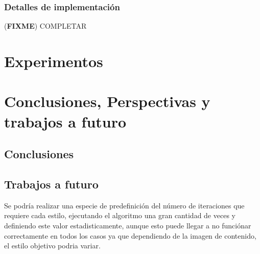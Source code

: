 \documentclass[a4paper,11pt,spanish]{book}
\newcommand*{\FIXME}[1]{{(\textbf{FIXME}) {#1}}}
\begin{document}
    \subsection{Detalles de implementación}
      \FIXME{COMPLETAR}

\chapter{Experimentos}

\chapter{Conclusiones, Perspectivas y trabajos a futuro}
  \section{Conclusiones}
  \section{Trabajos a futuro}
    Se podría realizar una especie de predefinición del número de iteraciones que requiere cada estilo, ejecutando el algoritmo una gran cantidad de veces y definiendo este valor
    estadisticamente, aunque esto puede llegar a no funciónar correctamente en todos los casos ya que dependiendo de la imagen de contenido, el estilo objetivo podria variar.
\printindex

\end{document}
